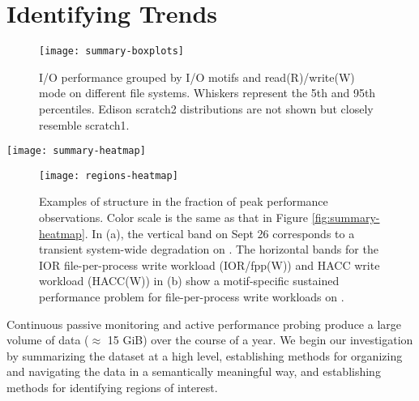 \section{Identifying Trends}  \label{sec:features}

\begin{figure}
    \centering
    \texttt{[image: summary-boxplots]}
    \vspace{-.15in}
    \caption{I/O performance grouped by I/O motifs and read(R)/write(W) mode on different file systems.  Whiskers represent the 5th and 95th percentiles.  Edison scratch2 distributions are not shown but closely resemble scratch1.}
    \label{fig:summary-boxplots}
	\vspace{-.15in}
\end{figure}

\begin{figure*}
    \centering
    \texttt{[image: summary-heatmap]}
    \vspace{-.2in}
    \caption{Performance of daily probes normalized to the peak observed performance for each probe type (I/O motif and read/write mode combination) on the specified system.  The y-axis labels show combinations of system, I/O motif, and mode (Read/Write).  Grey represents days on which no observations were made.  The two regions highlighted in green boxes are expanded upon in Figure \ref{fig:regions-heatmap}.}
    \label{fig:summary-heatmap}
\end{figure*}

\begin{figure}
    \centering
    \texttt{[image: regions-heatmap]}
    \vspace{-.2in}
    \caption{Examples of structure in the fraction of peak performance observations.  Color scale is the same as that in Figure \ref{fig:summary-heatmap}.  In (a), the vertical band on Sept 26 corresponds to a transient system-wide degradation on \mira.  The horizontal bands for the IOR file-per-process write workload (IOR/fpp(W)) and HACC write workload (HACC(W)) in (b) show a motif-specific sustained performance problem for file-per-process write workloads on \cori.}
    \label{fig:regions-heatmap}
\end{figure}

Continuous passive monitoring and active performance probing produce
a large volume of data ($\approx$ 15 GiB) over the course of a year.  We begin our
investigation by summarizing the dataset at a high level, establishing
methods for organizing and navigating the data in a semantically
meaningful way, and establishing methods for identifying regions of
interest.

